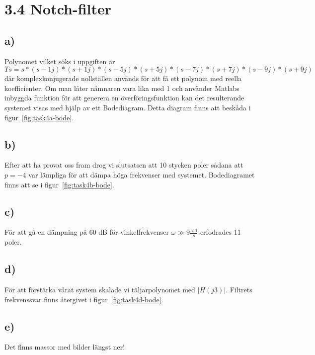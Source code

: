 \section*{3.4 Notch-filter}
\subsection*{a)}
Polynomet vilket söks i uppgiften är 
$Ts = s*(s-1j)*(s+1j)*(s-5j)*(s+5j)*(s-7j)*(s+7j)*(s-9j)*(s+9j)$ där
komplexkonjugerade nollställen används för att få ett polynom med reella
koefficienter. Om man låter nämnaren vara lika med 1 och använder Matlabs
inbyggda funktion för att generera en överföringsfunktion kan det resulterande
systemet visas med hjälp av ett Bodediagram. Detta diagram finns att beskåda i
figur~\ref{fig:task4a-bode}.

\subsection*{b)}
Efter att ha provat oss fram drog vi slutsatsen att 10 stycken poler sådana att
$p=-4$ var lämpliga för att dämpa höga frekvenser med systemet. Bodediagramet
finns att se i figur~\ref{fig:task4b-bode}.

\subsection*{c)}
För att gå en dämpning på 60 dB för vinkelfrekvenser $\omega \gg 9
\frac{\text{rad}}{s}$ erfodrades 11 poler.

\subsection*{d)}
För att förstärka vårat system skalade vi täljarpolynomet med $|H(j3)|$.
Filtrets frekvenssvar finns återgivet i figur~\ref{fig:task4d-bode}.

\subsection*{e)}
Det finns massor med bilder längst ner!
